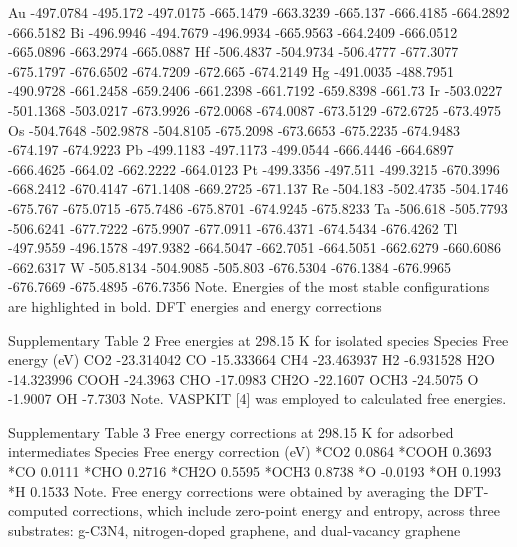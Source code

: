 Au	-497.0784	-495.172	-497.0175	-665.1479	-663.3239	-665.137	-666.4185	-664.2892	-666.5182
Bi	-496.9946	-494.7679	-496.9934	-665.9563	-664.2409	-666.0512	-665.0896	-663.2974	-665.0887
Hf	-506.4837	-504.9734	-506.4777	-677.3077	-675.1797	-676.6502	-674.7209	-672.665	-674.2149
Hg	-491.0035	-488.7951	-490.9728	-661.2458	-659.2406	-661.2398	-661.7192	-659.8398	-661.73
Ir	-503.0227	-501.1368	-503.0217	-673.9926	-672.0068	-674.0087	-673.5129	-672.6725	-673.4975
Os	-504.7648	-502.9878	-504.8105	-675.2098	-673.6653	-675.2235	-674.9483	-674.197	-674.9223
Pb	-499.1183	-497.1173	-499.0544	-666.4446	-664.6897	-666.4625	-664.02	-662.2222	-664.0123
Pt	-499.3356	-497.511	-499.3215	-670.3996	-668.2412	-670.4147	-671.1408	-669.2725	-671.137
Re	-504.183	-502.4735	-504.1746	-675.767	-675.0715	-675.7486	-675.8701	-674.9245	-675.8233
Ta	-506.618	-505.7793	-506.6241	-677.7222	-675.9907	-677.0911	-676.4371	-674.5434	-676.4262
Tl	-497.9559	-496.1578	-497.9382	-664.5047	-662.7051	-664.5051	-662.6279	-660.6086	-662.6317
W	-505.8134	-504.9085	-505.803	-676.5304	-676.1384	-676.9965	-676.7669	-675.4895	-676.7356
Note. Energies of the most stable configurations are highlighted in bold.
DFT energies and energy corrections

Supplementary Table 2
Free energies at 298.15 K for isolated species
Species	Free energy (eV)
CO2	-23.314042
CO	-15.333664
CH4	-23.463937
H2	-6.931528
H2O	-14.323996
COOH	-24.3963
CHO	-17.0983
CH2O	-22.1607
OCH3	-24.5075
O	-1.9007
OH	-7.7303
Note. VASPKIT [4] was employed to calculated free energies.


Supplementary Table 3
Free energy corrections at 298.15 K for adsorbed intermediates
Species	Free energy correction (eV)
*CO2	0.0864
*COOH	0.3693
*CO	0.0111
*CHO	0.2716
*CH2O	0.5595
*OCH3	0.8738
*O	-0.0193
*OH	0.1993
*H	0.1533
Note. Free energy corrections were obtained by averaging the DFT-computed corrections, which include zero-point energy and entropy, across three substrates: g-C3N4, nitrogen-doped graphene, and dual-vacancy graphene



